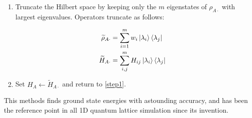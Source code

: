 \begin{enumerate}
  \item Truncate the Hilbert space by keeping only the $m$ eigenstates of
  $\rho_{A \cdot}$ with largest eigenvalues. Operators truncate as follows:

  \begin{align}
    \widetilde{\rho}_{A \cdot} & = \sum_{i = 1}^{m} w_i \ket{\lambda_i}\bra{\lambda_j} \\
    \widetilde{H}_{A \cdot} & = \sum_{i, j}^{m} H_{ij} \ket{\lambda_i}\bra{\lambda_j}   
  \end{align}

  \item Set $H_{A} \leftarrow \widetilde{H}_{A \cdot}$ and return to \ref{step1}.

\end{enumerate} 

This methods finds ground state energies with astounding accuracy, and has been
the reference point in all 1D quantum lattice simulation since its invention.






